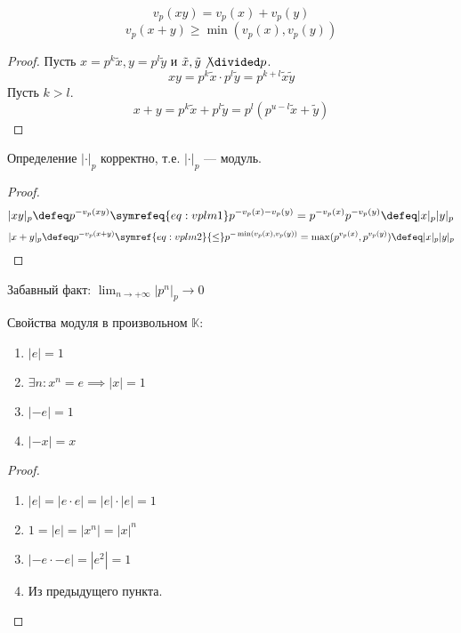 \begin{lemma}
	\begin{equation}
		v_p(xy) = v_p(x) + v_p(y) \label{eq:vplm1}
	\end{equation}
	\begin{equation}
		v_p(x + y) \ge \min(v_p(x), v_p(y)) \label{eq:vplm2}
	\end{equation}\[\]
\end{lemma}
\begin{proof}
	Пусть \(x = p^k \tilde{x}, y = p^l \tilde{y}\) и \(\tilde{x}, \tilde{y} \not\divided p\).
	\[xy = p^k \tilde{x} \cdot p^l \tilde{y} = p^{k + l} \tilde{x} \tilde{y}\]
	Пусть \(k > l\).
	\[x + y = p^k \tilde{x} + p^l \tilde{y} = p^l(p^{u - l} \tilde{x} + \tilde{y})\]
\end{proof}

\begin{lemma}
	Определение \(|\cdot|_p\) корректно, т.е. \(|\cdot|_p\) --- модуль.
\end{lemma}
\begin{proof}
	\[|xy|_p \defeq p^{-v_p(xy)} \symrefeq{eq:vplm1} p^{-v_p(x) -v_p(y)} = p^{-v_p(x)} p^{-v_p(y)} \defeq |x|_p |y|_p\]
	\[|x + y|_p \defeq p^{-v_p(x + y)} \symref{eq:vplm2}{\le} p^{-\min(v_p(x), v_p(y))}
     = \max(p^{v_p(x)}, p^{v_p(y)}) \defeq |x|_p |y|_p\]
\end{proof}

Забавный факт: \(\lim_{n \to +\infty} |p^n|_p \to 0\)

\begin{lemma}
    Свойства модуля в произвольном \(\mathbb{K}\):
    \begin{enumerate}
        \item \(|e| = 1\)
        \item \(\exists n : x^n = e \implies |x| = 1\)
        \item \(|-e| = 1\)
        \item \(|-x| = x\)
    \end{enumerate}
\end{lemma}
\begin{proof}\itemfix
    \begin{enumerate}
        \item \(|e| = |e \cdot e| = |e| \cdot |e| = 1\)  
        \item \(1 = |e| = |x^n| = |x|^n\) 
        \item \(|-e \cdot -e| = |e^2| = 1\)
        \item Из предыдущего пункта.
    \end{enumerate}
\end{proof}

